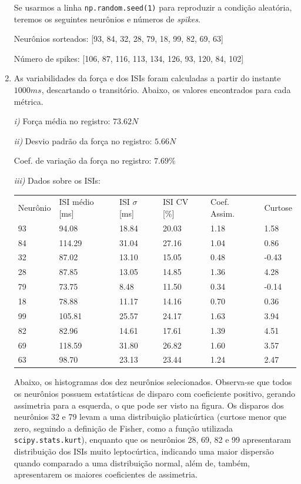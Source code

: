 \documentclass[12pt,letterpaper]{article}
\begin{document}
\begin{enumerate}[label=(\alph*)]
\newpage
    Se usarmos a linha \lstinline{np.random.seed(1)} para reproduzir a condição aleatória, teremos os seguintes neurônios e números de {\it spikes}.
    
    Neurônios sorteados:
    [93, 84, 32, 28, 79, 18, 99, 82, 69, 63]

    Número de spikes:
    [106, 87, 116, 113, 134, 126, 93, 120, 84, 102]

    \item
    As variabilidades da força e dos ISIs foram calculadas a partir do instante ${1000ms}$, descartando o transitório. Abaixo, os valores encontrados para cada métrica.
    
    {\it i)} Força média no registro: ${73.62 N}$
    
    {\it ii)} Desvio padrão da força no registro: ${5.66 N}$
    
    Coef. de variação da força no registro: ${7.69 \%}$
      
    {\it iii)} Dados sobre os ISIs:
    
        \begin{table}[H]
        \centering
        \begin{tabular}{llllll}
            Neurônio & ISI médio [ms] & ISI ${\sigma}$ [ms] & ISI CV [\%] & Coef. Assim. & Curtose \\ 
            93 & 94.08 & 18.84 & 20.03 & 1.18 & 1.58 \\
            84 & 114.29 & 31.04 & 27.16 & 1.04 & 0.86 \\
            32 & 87.02 & 13.10 & 15.05 & 0.48 & -0.43 \\
            28 & 87.85 & 13.05 & 14.85 & 1.36 & 4.28 \\
            79 & 73.75 & 8.48 & 11.50 & 0.34 & -0.14 \\
            18 & 78.88 & 11.17 & 14.16 & 0.70 & 0.36 \\
            99 & 105.81 & 25.57 & 24.17 & 1.63 & 3.94 \\
            82 & 82.96 & 14.61 & 17.61 & 1.39 & 4.51 \\
            69 & 118.59 & 31.80 & 26.82 & 1.60 & 3.57 \\
            63 & 98.70 & 23.13 & 23.44 & 1.24 & 2.47 \\
        \end{tabular}
        \end{table}
    
    Abaixo, os histogramas dos dez neurônios selecionados. Observa-se que todos os neurônios possuem estatísticas de disparo com coeficiente positivo, gerando assimetria para a esquerda, o que pode ser visto na figura. Os disparos dos neurônios 32 e 79 levam a uma distribuição platicúrtica (curtose menor que zero, seguindo a definição de Fisher, como a função utilizada \lstinline{scipy.stats.kurt}), enquanto que os neurônios 28, 69, 82 e 99 apresentaram distribuição dos ISIs muito leptocúrtica, indicando uma maior dispersão quando comparado a uma distribuição normal, além de, também, apresentarem os maiores coeficientes de assimetria.
    

\end{enumerate}
\end{document}

